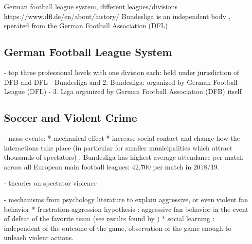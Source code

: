 \documentclass[11pt, a4paper]{article} %
\begin{document}
German football league system, different leagues/divisions
https://www.dfl.de/en/about/history/
Bundesliga is an independent body , sperated from the German Football Association (DFL)





\subsection{German Football League System}
- top three professional levels with one division each: held under jurisdiction of DFB and DFL
- Bundesliga and 2. Bundesliga: organized by German Football League (DFL)
- 3. Liga organized by German Football Association (DFB) itself



\subsection{Soccer and Violent Crime}

- mass events: 
	* mechanical effect
	* increase social contact and change how the interactions take place (in particular for smaller municipalities which attract thousands of spectators) \cite{lindo2018college}. Bundesliga has highest average attendance per match across all European main football leagues\citep{wicker2017effect}: 42,700 per match in 2018/19.

- theories on spectator violence

- mechanisms from psychology literature to explain aggressive, or even violent fan behavior
	* frustration-aggression hypothesis \cite{dollard1939frustration}: aggressive fan behavior in the event of defeat of the favorite team (see results found by \cite{card2011family})
	* social learning \cite{bandura1973aggression,bandura2007social}: independent of the outcome of the game, observation of the game enough to unleash violent actions. 
\end{document}
